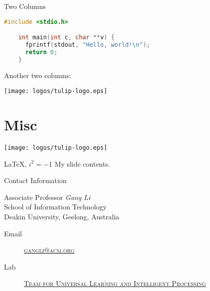 \documentclass[
 size=12pt,
 paper=smartboard, %
 mode=present, %
 display=slides, %
style=tuliplab,
pauseslide,
fleqn,leqno]{powerdot}
\begin{document}
\begin{slide}[method=direct]{Two Columns}
  \begin{lstlisting}[language=c,gobble=4]
    #include <stdio.h>

    int main(int c, char **v) {
      fprintf(stdout, "Hello, world!\n");
      return 0;
    }
  \end{lstlisting}
Another two columns:

{
     \centerline{\texttt{[image: logos/tulip-logo.eps]}}
}

\end{slide}



\section{Misc}

\begin{emptyslide}{}
\centering
{}
\texttt{[image: logos/tulip-logo.eps]}
\end{emptyslide}


\begin{slide}[toc=,bm={LaTeX, i*i=-1}]{\color{red}\LaTeX, $i^2=-1$}
My slide contents.
\end{slide}

\begin{wideslide}[toc=,bm=]{Contact Information}
\centering
{}
\twocolumn[
lcolwidth=0.35\linewidth,
rcolwidth=0.65\linewidth
]
{
}
{
Associate Professor \emph{Gang Li}\\
School of Information Technology\\
Deakin University, Geelong, Australia
\begin{description}
 \item[Email] \href{mailto:gangli@acm.org}
 {\textsc{\footnotesize{gangli@acm.org}}}
 
 \item[Lab] \href{http://www.tulip.org.au}
 {\textsc{\footnotesize{Team for Universal Learning and Intelligent Processing}}} 
\end{description}
} 
\end{wideslide}
\end{document}

